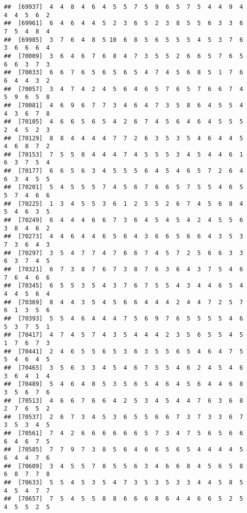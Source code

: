 \documentclass[
]{book}
\begin{document}
\begin{verbatim}
##  [69937]  4  4  8  4  6  4  5  5  7  5  9  6  5  7  5  4  4  9  4  4  4  5  6  2
##  [69961]  6  4  6  4  4  5  2  3  6  5  2  3  8  5  5  6  3  3  6  7  5  4  8  4
##  [69985]  3  7  6  4  8  5 10  6  8  5  6  5  5  5  4  5  3  7  6  3  6  6  6  4
##  [70009]  3  6  4  6  7  6  8  4  7  3  5  5  2  6  6  5  7  6  5  6  6  3  7  3
##  [70033]  6  6  7  6  5  6  5  6  5  4  7  4  5  6  8  5  1  7  6  6  4  4  3  2
##  [70057]  3  4  7  4  2  4  5  6  4  6  5  7  6  5  7  6  6  7  4  5  9  6  5  8
##  [70081]  4  6  9  6  7  7  3  4  6  4  7  3  5  8  6  4  5  5  4  4  3  6  7  8
##  [70105]  4  6  6  5  6  5  4  2  6  7  4  5  6  4  6  4  5  5  5  2  4  5  2  3
##  [70129]  8  8  4  4  4  4  7  7  2  6  3  5  3  5  4  6  4  4  5  4  6  8  7  2
##  [70153]  7  5  5  8  4  4  4  7  4  5  5  5  3  4  5  4  4  6  1  6  3  7  5  4
##  [70177]  6  6  5  6  3  4  5  5  5  6  4  5  4  6  5  7  2  6  4  6  3  4  5  5
##  [70201]  5  4  5  5  5  7  4  5  6  7  6  6  5  7  5  5  4  6  5  5  7  4  6  6
##  [70225]  1  3  4  5  5  3  6  1  2  5  5  2  6  7  4  5  6  8  4  5  4  6  3  5
##  [70249]  6  4  4  4  6  6  7  3  6  4  5  4  5  4  2  4  5  5  6  3  8  4  6  2
##  [70273]  4  4  6  4  4  6  5  6  4  3  6  6  5  6  6  4  3  5  3  7  3  6  4  3
##  [70297]  3  5  4  7  7  4  7  6  6  7  4  5  7  2  5  6  6  3  3  6  3  7  4  5
##  [70321]  6  7  3  8  7  6  7  3  8  7  6  3  6  4  3  7  5  4  6  7  6  4  6  6
##  [70345]  6  5  5  3  5  4  3  7  6  7  5  5  4  3  4  4  6  5  4  4  4  5  6  4
##  [70369]  8  4  4  3  5  4  5  6  6  4  4  4  2  4  4  7  2  5  7  6  1  3  5  6
##  [70393]  5  5  4  6  4  4  4  7  5  6  9  7  6  5  5  5  5  4  6  5  3  7  5  1
##  [70417]  4  7  4  5  7  4  3  5  4  4  4  2  3  5  6  5  5  4  5  1  7  6  7  3
##  [70441]  2  4  6  5  5  6  5  3  6  3  5  5  6  5  4  6  4  7  5  5  4  6  4  5
##  [70465]  3  5  6  3  3  4  5  4  6  7  5  5  4  6  2  4  5  4  6  3  6  4  1  4
##  [70489]  5  4  6  4  8  5  3  5  6  5  4  6  4  5  6  4  4  6  8  3  5  6  7  6
##  [70513]  4  6  6  7  6  6  4  2  5  3  4  5  4  4  7  6  3  6  8  2  7  6  5  2
##  [70537]  2  6  7  3  4  5  3  6  5  5  6  6  7  3  7  3  3  6  7  3  5  3  4  5
##  [70561]  7  4  2  6  6  6  6  6  6  5  7  3  4  7  5  6  5  6  6  6  4  6  7  5
##  [70585]  7  7  9  7  3  8  5  6  4  6  6  5  6  5  4  4  4  4  5  6  4  4  7  6
##  [70609]  3  4  5  5  7  8  5  5  6  3  4  6  6  8  4  5  6  5  8  6  8  7  7  8
##  [70633]  5  5  4  5  3  5  4  7  3  5  3  5  3  3  4  4  5  8  5  4  5  4  7  7
##  [70657]  7  5  4  5  5  8  8  6  6  6  8  6  4  4  6  6  5  2  5  4  5  5  2  5

\end{verbatim}
\end{document}
